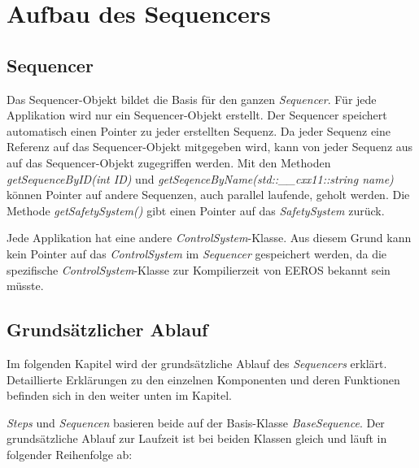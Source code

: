 \chapter{Aufbau des Sequencers}
\label{sequencerAufbau}
\section{Sequencer}
Das Sequencer-Objekt bildet die Basis für den ganzen \textit{Sequencer}.
Für jede Applikation wird nur ein Sequencer-Objekt erstellt.
Der Sequencer speichert automatisch einen Pointer zu jeder erstellten Sequenz.
Da jeder Sequenz eine Referenz auf das Sequencer-Objekt mitgegeben wird, kann von jeder Sequenz aus auf das Sequencer-Objekt zugegriffen werden.
Mit den Methoden \textit{getSequenceByID(int ID)} und \textit{getSeqenceByName(std::\_\_cxx11::string name)} können Pointer auf andere Sequenzen, auch parallel laufende, geholt werden.
Die Methode \textit{getSafetySystem()} gibt einen Pointer auf das \textit{SafetySystem} zurück.

Jede Applikation hat eine andere \textit{ControlSystem}-Klasse.
Aus diesem Grund kann kein Pointer auf das \textit{ControlSystem} im \textit{Sequencer} gespeichert werden, da die spezifische \textit{ControlSystem}-Klasse zur Kompilierzeit von EEROS bekannt sein müsste.



\section{Grundsätzlicher Ablauf}
Im folgenden Kapitel wird der grundsätzliche Ablauf des \textit{Sequencers} erklärt.
Detaillierte Erklärungen zu den einzelnen Komponenten und deren Funktionen befinden sich in den weiter unten im Kapitel.

\textit{Steps} und \textit{Sequencen} basieren beide auf der Basis-Klasse \textit{BaseSequence}.
Der grundsätzliche Ablauf zur Laufzeit ist bei beiden Klassen gleich und läuft in folgender Reihenfolge ab:

